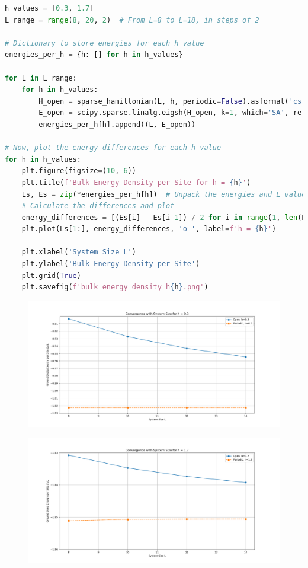 \documentclass[12pt]{article}
\begin{document}
\begin{lstlisting}[language=Python]
h_values = [0.3, 1.7]
L_range = range(8, 20, 2)  # From L=8 to L=18, in steps of 2

# Dictionary to store energies for each h value
energies_per_h = {h: [] for h in h_values}

for L in L_range:
    for h in h_values:
        H_open = sparse_hamiltonian(L, h, periodic=False).asformat('csr')
        E_open = scipy.sparse.linalg.eigsh(H_open, k=1, which='SA', return_eigenvectors=False)[0]
        energies_per_h[h].append((L, E_open))

# Now, plot the energy differences for each h value
for h in h_values:
    plt.figure(figsize=(10, 6))
    plt.title(f'Bulk Energy Density per Site for h = {h}')
    Ls, Es = zip(*energies_per_h[h])  # Unpack the energies and L values
    # Calculate the differences and plot
    energy_differences = [(Es[i] - Es[i-1]) / 2 for i in range(1, len(Es))]
    plt.plot(Ls[1:], energy_differences, 'o-', label=f'h = {h}')

    plt.xlabel('System Size L')
    plt.ylabel('Bulk Energy Density per Site')
    plt.grid(True)
    plt.savefig(f'bulk_energy_density_h{h}.png')
\end{lstlisting}
\newpage
\begin{figure}[h]
\centering
\includegraphics[width=\textwidth]{convergence_h0.3.png}
\end{figure}
\begin{figure}[h]
\centering
\includegraphics[width=\textwidth]{convergence_h1.7.png}
\end{figure}
\end{document}
